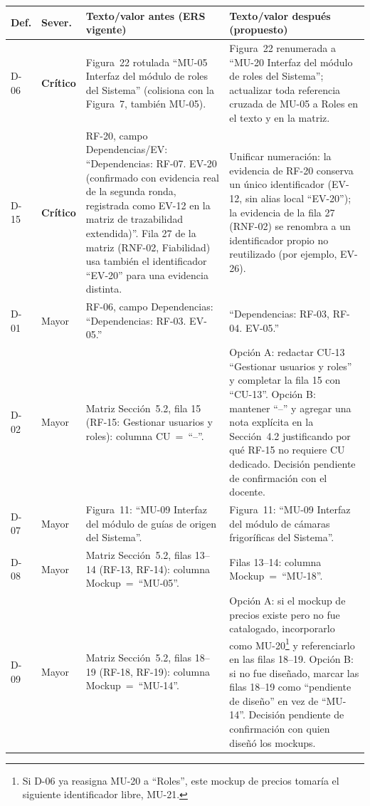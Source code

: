 \documentclass[11pt,a4paper]{article}
\begin{document}
\begin{longtable}{|p{0.8cm}|p{1.1cm}|p{5.7cm}|p{5.7cm}|}
\hline
\textbf{Def.} & \textbf{Sever.} & \textbf{Texto/valor antes (ERS vigente)} & \textbf{Texto/valor después (propuesto)} \\
\hline
D-06 & \textbf{Crítico} & Figura~22 rotulada ``MU-05 Interfaz del módulo de roles del Sistema'' (colisiona con la Figura~7, también MU-05). & Figura~22 renumerada a ``MU-20 Interfaz del módulo de roles del Sistema''; actualizar toda referencia cruzada de MU-05 a Roles en el texto y en la matriz. \\
\hline
D-15 & \textbf{Crítico} & RF-20, campo Dependencias/EV: ``Dependencias: RF-07. EV-20 (confirmado con evidencia real de la segunda ronda, registrada como EV-12 en la matriz de trazabilidad extendida)''. Fila 27 de la matriz (RNF-02, Fiabilidad) usa también el identificador ``EV-20'' para una evidencia distinta. & Unificar numeración: la evidencia de RF-20 conserva un único identificador (EV-12, sin alias local ``EV-20''); la evidencia de la fila 27 (RNF-02) se renombra a un identificador propio no reutilizado (por ejemplo, EV-26). \\
\hline
D-01 & Mayor & RF-06, campo Dependencias: ``Dependencias: RF-03. EV-05.'' & ``Dependencias: RF-03, RF-04. EV-05.'' \\
\hline
D-02 & Mayor & Matriz Sección~5.2, fila 15 (RF-15: Gestionar usuarios y roles): columna CU~=~``--''. & Opción A: redactar CU-13 ``Gestionar usuarios y roles'' y completar la fila 15 con ``CU-13''. Opción B: mantener ``--'' y agregar una nota explícita en la Sección~4.2 justificando por qué RF-15 no requiere CU dedicado. Decisión pendiente de confirmación con el docente. \\
\hline
D-07 & Mayor & Figura~11: ``MU-09 Interfaz del módulo de guías de origen del Sistema''. & Figura~11: ``MU-09 Interfaz del módulo de cámaras frigoríficas del Sistema''. \\
\hline
D-08 & Mayor & Matriz Sección~5.2, filas 13--14 (RF-13, RF-14): columna Mockup~=~``MU-05''. & Filas 13--14: columna Mockup~=~``MU-18''. \\
\hline
D-09 & Mayor & Matriz Sección~5.2, filas 18--19 (RF-18, RF-19): columna Mockup~=~``MU-14''. & Opción A: si el mockup de precios existe pero no fue catalogado, incorporarlo como MU-20\footnote{Si D-06 ya reasigna MU-20 a ``Roles'', este mockup de precios tomaría el siguiente identificador libre, MU-21.} y referenciarlo en las filas 18--19. Opción B: si no fue diseñado, marcar las filas 18--19 como ``pendiente de diseño'' en vez de ``MU-14''. Decisión pendiente de confirmación con quien diseñó los mockups. \\

\end{longtable}
\end{document}
